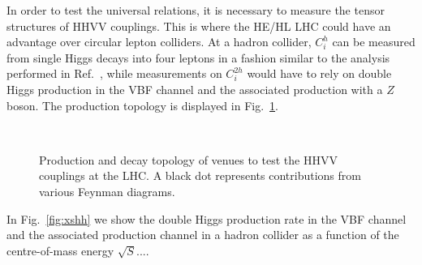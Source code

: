 
In order to test the universal relations, it is necessary to measure the tensor structures of HHVV couplings. This is where the HE/HL LHC could have an advantage over circular lepton colliders. At a hadron collider, $C^h_i$ can be measured from single Higgs decays into four leptons in a fashion similar to the analysis performed in Ref.~\cite{Sirunyan:2017tqd}, while measurements on $C^{2h}_i$ would have to rely on double Higgs production in the VBF  channel and the associated production with a $Z$ boson. The production topology is displayed in Fig.~\ref{fig:testhh}.


\begin{figure}[!t]
\centering
  \quad \ \ %
  \caption{Production and decay topology of venues to test the HHVV couplings at the LHC. A black dot represents contributions from various Feynman diagrams. \label{fig:testhh}}
\end{figure}

In Fig.~\ref{fig:xshh}  we show the double Higgs production rate in the VBF channel and the associated production channel in a hadron collider as a function of the centre-of-mass energy $\sqrt{S}$.... 


